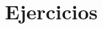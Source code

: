 \documentclass[a4paper,12pt]{article}
\begin{document}


\section{Ejercicios}
\label{sec:ejercicios}
\end{document}
